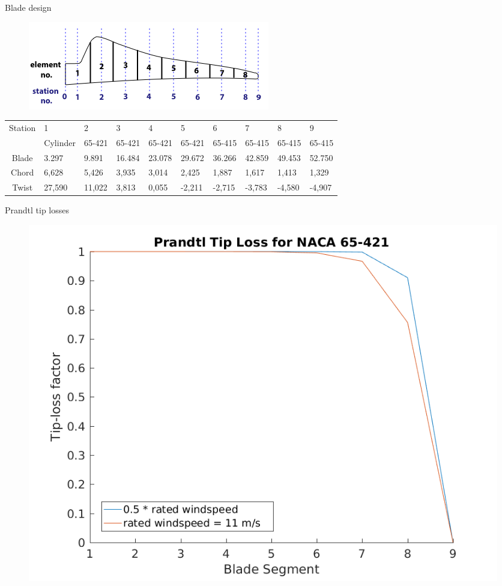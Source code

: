 \documentclass[12pt,t]{beamer}
\begin{document}
\begin{frame}
\huge
Blade design
\Tiny
\begin{figure}[H]
\includegraphics[width=0.6\linewidth]{../CIP_2/Figures/blade_elements.png}
\label{fig:blade_elemets}
\end{figure}

\begin{table}[H]
\begin{tabular}{c| l l l l l l l l l}
\hline
Station  & 	1&	2&	3	&4	&5	&6	&7	&8	&9\\
&Cylinder&65-421&65-421&65-421&65-421& 65-415& 65-415& 65-415&65-415\\
\hline
Blade&	3.297&	9.891&	16.484&	23.078&	29.672&	36.266&	42.859&	49.453&	52.750\\
\hline
Chord &	6,628	&5,426&	3,935	&3,014&	2,425&	1,887&	1,617&	1,413&	1,329\\
Twist &	27,590&	11,022&	3,813&	0,055&	-2,211&	-2,715&	-3,783&	-4,580&	-4,907\\
\hline
\end{tabular}
\label{final_blade_design_schmitz}
\end{table}
\end{frame}

\begin{frame}
\huge
Prandtl tip losses
\Tiny
\begin{figure}[H]
\centering
\includegraphics[width=0.8\linewidth]{../CIP_2/Figures/prandtl_tip_loss.png}
\end{figure}
\end{frame}
\end{document}

